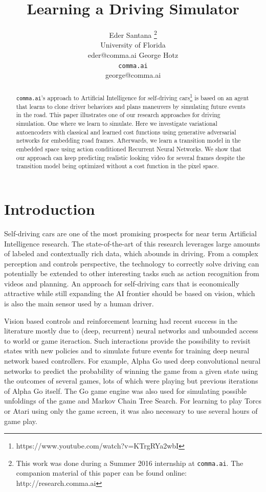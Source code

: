 \documentclass{article} %
\title{Learning a Driving Simulator}
\author{
Eder Santana
\thanks{This work was done during a Summer 2016 internship at \texttt{comma.ai}. The companion material of this paper
can be found online: http://research.comma.ai} \\
University of Florida\\
eder@comma.ai
\And
George Hotz \\
\texttt{comma.ai} \\
george@comma.ai
}
\begin{document}
\maketitle

\begin{abstract}
\texttt{comma.ai}'s approach to Artificial Intelligence for self-driving cars\footnote{https://www.youtube.com/watch?v=KTrgRYa2wbI} is based on an agent that learns to clone driver behaviors and plans maneuvers by simulating future events in the road.
This paper illustrates one of our research approaches for driving simulation. One where
we learn to simulate. Here we investigate variational autoencoders with classical and learned cost functions
using generative adversarial networks for embedding road frames. Afterwards, we learn a transition model
in the embedded space using action conditioned Recurrent Neural Networks. We show that our approach can keep predicting
realistic looking video for several frames despite the transition model being optimized without a cost function in the pixel space.
\end{abstract}

\section{Introduction}
\label{sec:intro}

Self-driving cars are one of the most promising prospects for near term Artificial Intelligence research.
The state-of-the-art of this research leverages large amounts of labeled and contextually rich data,
which abounds in driving. From a complex perception and controls perspective, the technology to correctly solve driving
can potentially be extended to other interesting tasks such as action recognition from videos and planning.
An approach for self-driving cars that is economically attractive while still expanding the AI frontier
should be based on vision, which is also the main sensor used by a human driver.

Vision based controls and reinforcement learning had recent success in the literature \cite{schimidhubercar} \cite{atarinature} \cite{alphago} \cite{googlerobotarm}
mostly due to (deep, recurrent) neural networks and unbounded access to world or game iteraction. Such interactions
provide the possibility to revisit states with new policies and to simulate future events for training deep neural network based
controllers. For example, Alpha Go \cite{alphago} used deep convolutional neural networks to predict the probability of winning the game
from a given state using the outcomes of several games, lots of which were playing but previous iterations of Alpha Go itself. The Go game engine was also
used for simulating possible unfoldings of the game and Markov Chain Tree Search. For learning to play Torcs \cite{schimidhubercar} or Atari \cite{atarinature}
using only the game screen, it was also necessary to use several hours of game play.
\end{document}
